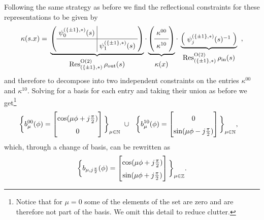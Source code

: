 \documentclass{article}
\DeclareMathOperator*{\Z}{\mathbb{Z}}
\DeclareMathOperator*{\N}{\mathbb{N}}
\renewcommand{\O}[1]{\ensuremath{\operatorname{O}(#1)}}
\newcommand{\Flip}{(\{\pm 1\}, *)}
\newcommand{\Res}[2]{\ensuremath{\operatorname{Res}_{#1}^{#2}}}
\begin{document}
Following the same strategy as before we find the reflectional constraints for these representations to be given by \[
\kappa(s.x) = 
\\
\underbrace{
	\left(
	{\setlength\arraycolsep{3pt}
		\def\arraystretch{1.5}
		\begin{array}{c|c}
		\psi_0^{\Flip}(s) & \\ \hline
		& \psi_1^{\Flip}(s) \\
		\end{array}
	}
	\right)
}_{
\textstyle\begin{array}{c}
\Res{\Flip}{\O2}\rho_\text{out}(s)
\end{array}
}
\cdot
\underbrace{
	\left(
	{\setlength\arraycolsep{3pt}
		\def\arraystretch{1.5}
		\begin{array}{c}
		\kappa^{00} \\ \hline
		\kappa^{10} \\
		\end{array}
	}
	\right)
}_{
\textstyle\begin{array}{c}
\kappa(x)
\end{array}
}
\cdot
\underbrace{
	\left(
	{\setlength\arraycolsep{3pt}
		\def\arraystretch{1.5}
		\begin{array}{c}
		\psi_j^{\Flip}(s)^{-1} \\
		\end{array}
	}
	\right)
}_{
\textstyle\begin{array}{c}
\Res{\Flip}{\O2}\rho_\text{in}(s)
\end{array}
}\ ,
\]
and therefore to decompose into two independent constraints on the entries $\kappa^{00}$ and $\kappa^{10}$.
Solving for a basis for each entry and taking their union as before we get\footnote{Notice that for $\mu=0$ some of the elements of the set are zero and are therefore not part of the basis. We omit this detail to reduce clutter.}
\begin{align*}
\bigg\{b^{00}_{\mu}(\phi) = \begin{bmatrix} \cos(\mu\phi + j{\pi\over2}) \\ 0 \end{bmatrix} \bigg\}_{\mu \in \N } \ &\cup \ \ 
	\bigg\{b^{10}_{\mu}(\phi) = \begin{bmatrix} 0 \\ \sin(\mu\phi -j{\pi\over2}) \end{bmatrix} \bigg\}_{\mu \in \N },
\end{align*}
which, through a change of basis, can be rewritten as
\begin{align}
\label{eq:o2_1x2_starting_basis}
	\bigg\{b_{\mu,j{\pi\over2}}(\phi) = \begin{bmatrix} \cos(\mu\phi + j{\pi\over2})\\ \sin(\mu\phi + j{\pi\over2}) \end{bmatrix} \bigg\}_{\mu \in \Z }.
\end{align}
\end{document}
